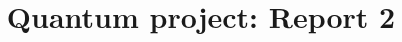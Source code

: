 \documentclass[11pt]{article}
\title{Quantum project: Report 2}
\author{}
\begin{document}
\maketitle

\end{document}
